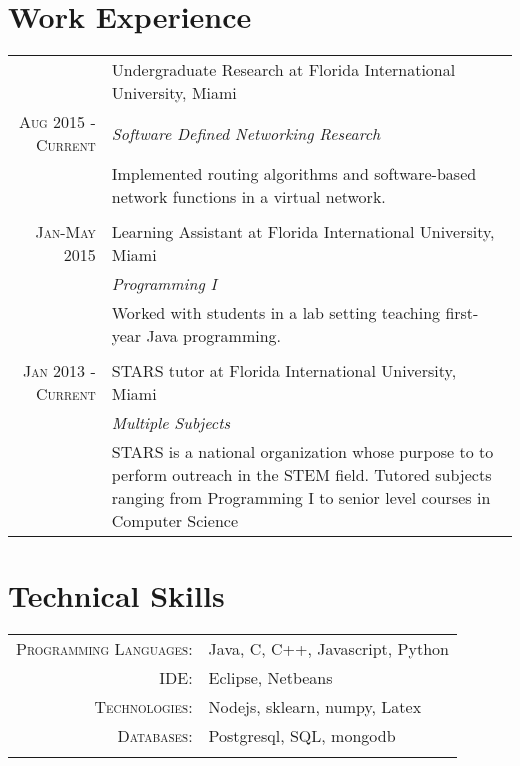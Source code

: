 \documentclass[a4paper,10pt]{article}
\begin{document}
\section{Work Experience}
\begin{tabular}{r|p{11cm}}
 & Undergraduate Research at Florida International University, Miami \\\textsc{Aug 2015 - Current}&\emph{Software Defined Networking Research}\\&\footnotesize{Implemented routing algorithms and software-based network functions in a virtual network.  }\\\multicolumn{2}{c}{} \\
 \textsc{Jan-May 2015} & Learning Assistant at Florida International University, Miami \\&\emph{Programming I}\\&\footnotesize{Worked with students in a lab setting teaching first-year Java programming.}\\\multicolumn{2}{c}{} \\
\textsc{Jan 2013 - Current} & STARS tutor at Florida International University, Miami\\& \emph{Multiple Subjects}\\&\footnotesize{STARS is a national organization whose purpose to to perform outreach in the STEM field. Tutored subjects ranging from Programming I to senior level courses in Computer Science}
\end{tabular}

\section{Technical Skills}
\begin{tabular}{r|p{11cm}}
 \textsc{Programming Languages:} & Java, C, C++, Javascript, Python \\
 \textsc{IDE:} & Eclipse, Netbeans \\
 \textsc{Technologies:} & Nodejs, sklearn, numpy, Latex \\
 \textsc{Databases:} & Postgresql, SQL, mongodb \\
 \multicolumn{2}{c}{} \\
\end{tabular}


\end{document}
